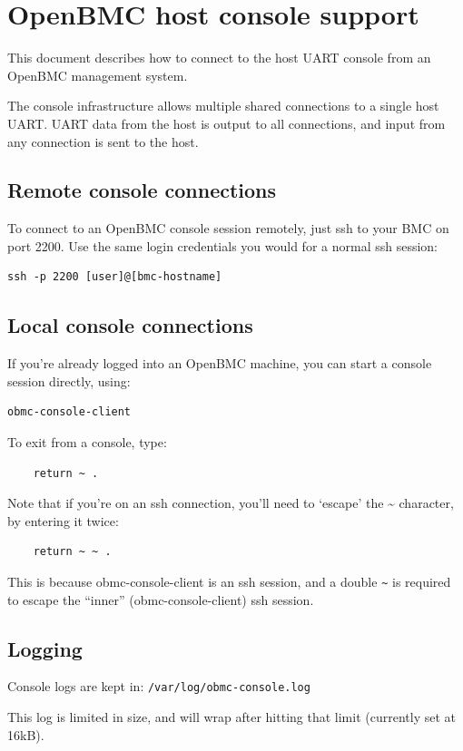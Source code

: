 \hypertarget{openbmc-host-console-support}{%
\section{OpenBMC host console
support}\label{openbmc-host-console-support}}

This document describes how to connect to the host UART console from an
OpenBMC management system.

The console infrastructure allows multiple shared connections to a
single host UART. UART data from the host is output to all connections,
and input from any connection is sent to the host.

\hypertarget{remote-console-connections}{%
\subsection{Remote console
connections}\label{remote-console-connections}}

To connect to an OpenBMC console session remotely, just ssh to your BMC
on port 2200. Use the same login credentials you would for a normal ssh
session:

\begin{verbatim}
ssh -p 2200 [user]@[bmc-hostname]
\end{verbatim}

\hypertarget{local-console-connections}{%
\subsection{Local console connections}\label{local-console-connections}}

If you're already logged into an OpenBMC machine, you can start a
console session directly, using:

\begin{verbatim}
obmc-console-client
\end{verbatim}

To exit from a console, type:

\begin{verbatim}
    return ~ .
\end{verbatim}

Note that if you're on an ssh connection, you'll need to `escape' the
\textasciitilde{} character, by entering it twice:

\begin{verbatim}
    return ~ ~ .
\end{verbatim}

This is because obmc-console-client is an ssh session, and a double
\texttt{\textasciitilde{}} is required to escape the ``inner''
(obmc-console-client) ssh session.

\hypertarget{logging}{%
\subsection{Logging}\label{logging}}

Console logs are kept in: \texttt{/var/log/obmc-console.log}

This log is limited in size, and will wrap after hitting that limit
(currently set at 16kB).
